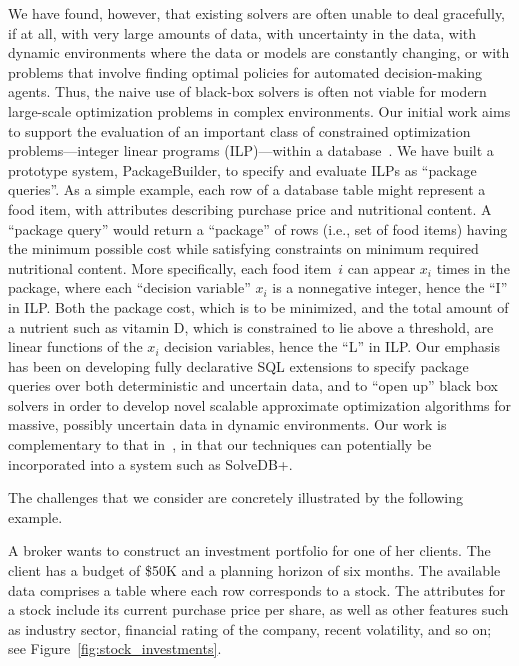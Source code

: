 \documentclass[11pt]{article}
\begin{document}
We have found, however, that existing solvers are often unable to deal
gracefully, if at all, with very large amounts of data, with uncertainty in the
data, with dynamic environments where the data or models are constantly
changing, or with problems that involve finding optimal policies for automated decision-making agents. Thus, the naive use of black-box solvers is often not viable for modern
large-scale optimization problems in complex environments. Our initial work aims to support the evaluation of an important class of constrained
optimization problems---integer linear programs (ILP)---within a
database~\cite{BrucatoAM18,BrucatoBAM16}. We have built a prototype system,
PackageBuilder, to specify and evaluate ILPs as ``package queries''. As a
simple example, each row of a database table might represent a food item, with
attributes describing purchase price and nutritional content. A ``package
query'' would return a ``package'' of rows (i.e., set of food items) having the
minimum possible cost while satisfying constraints on minimum required
nutritional content. More specifically, each food item~$i$ can appear $x_i$
times in the package, where each ``decision variable'' $x_i$ is a nonnegative
integer, hence the ``I'' in ILP. Both the package cost, which is to be
minimized, and the total amount of a nutrient such as vitamin D, which is
constrained to lie above a threshold, are linear functions of the $x_i$
decision variables, hence the ``L'' in ILP. Our emphasis has been on developing
fully declarative SQL extensions to specify package queries over both
deterministic and uncertain data, and to ``open up'' black box solvers in order
to develop novel scalable approximate optimization algorithms for massive,
possibly uncertain data in dynamic environments. Our work is complementary to
that in~\cite{SiksnysP16,SiksnysPNF21}, in that our techniques can potentially
be incorporated into a system such as SolveDB+.

The challenges that we consider are concretely illustrated by the following example.


\begin{example}\label{ex:invest}
A broker wants to construct an investment portfolio for one of her clients. The client has a budget of \$50K and a planning horizon of six months. The available data comprises a table where each row corresponds to a stock. The attributes for a stock include its current purchase price per share, as well as other features such as industry sector, financial rating of the company, recent volatility, and so on; see Figure~\ref{fig:stock_investments}. 
\end{example}
\end{document}
